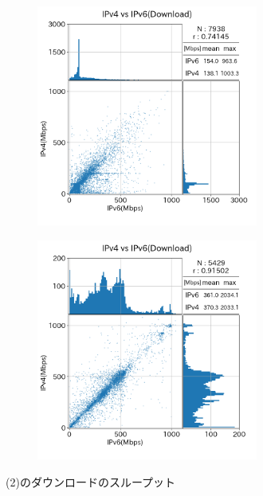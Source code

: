 \begin{figure}[htbp]
\begin{center}
\begin{minipage}[t]{0.48\textwidth}
\begin{subfigure}[b]{\textwidth}
                \label{new_IPv4aaS_dl}
            \end{subfigure}
            \begin{subfigure}[b]{\textwidth}
                \centering
                \includegraphics[width=0.8\textwidth]{fig/new_mix_dl.png}
                \label{new_mix_dl}
            \end{subfigure}
            \begin{subfigure}[b]{\textwidth}
                \centering
                \includegraphics[width=0.8\textwidth]{fig/new_PPPoE_dl.png}
                \label{new_PPPoE_dl}
            \end{subfigure}
            \caption{(2)のダウンロードのスループット}
            \label{fig:new_connect_dl}
        \end{minipage}
    \end{center}
\end{figure}
\FloatBarrier

